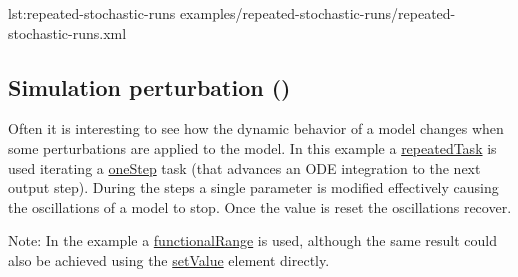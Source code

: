 {lst:repeated-stochastic-runs}
{examples/repeated-stochastic-runs/repeated-stochastic-runs.xml}


\subsection{Simulation perturbation ()}
Often it is interesting to see how the dynamic behavior of a model changes when some perturbations are applied to the model. In this example a \hyperref[class:repeatedTask]{repeatedTask} is used iterating a \hyperref[class:oneStep]{oneStep} task (that advances an ODE integration to the next output step). During the steps a single parameter is modified effectively causing the oscillations of a model to stop. Once the value is reset the oscillations recover. 

Note: In the example a \hyperref[class:functionalRange]{functionalRange} is used, although the same result could also be achieved using the \hyperref[class:setValue]{setValue} element directly.

